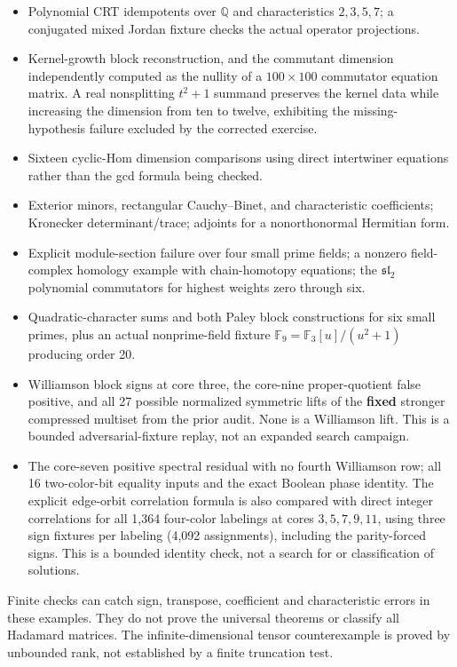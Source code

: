 \documentclass[
  11pt,
]{article}
\providecommand{\tightlist}{%
  \setlength{\itemsep}{0pt}\setlength{\parskip}{0pt}}
\begin{document}
\begin{itemize}
\tightlist
\item
  Polynomial CRT idempotents over \(\mathbb Q\) and characteristics
  \(2,3,5,7\); a conjugated mixed Jordan fixture checks the actual
  operator projections.
\item
  Kernel-growth block reconstruction, and the commutant dimension
  independently computed as the nullity of a \(100\times100\) commutator
  equation matrix. A real nonsplitting \(t^2+1\) summand preserves the
  kernel data while increasing the dimension from ten to twelve,
  exhibiting the missing-hypothesis failure excluded by the corrected
  exercise.
\item
  Sixteen cyclic-Hom dimension comparisons using direct intertwiner
  equations rather than the gcd formula being checked.
\item
  Exterior minors, rectangular Cauchy--Binet, and characteristic
  coefficients; Kronecker determinant/trace; adjoints for a
  nonorthonormal Hermitian form.
\item
  Explicit module-section failure over four small prime fields; a
  nonzero field-complex homology example with chain-homotopy equations;
  the \(\mathfrak{sl}_2\) polynomial commutators for highest weights
  zero through six.
\item
  Quadratic-character sums and both Paley block constructions for six
  small primes, plus an actual nonprime-field fixture
  \(\mathbb F_9=\mathbb F_3[u]/(u^2+1)\) producing order 20.
\item
  Williamson block signs at core three, the core-nine proper-quotient
  false positive, and all 27 possible normalized symmetric lifts of the
  \textbf{fixed} stronger compressed multiset from the prior audit. None
  is a Williamson lift. This is a bounded adversarial-fixture replay,
  not an expanded search campaign.
\item
  The core-seven positive spectral residual with no fourth Williamson
  row; all 16 two-color-bit equality inputs and the exact Boolean phase
  identity. The explicit edge-orbit correlation formula is also compared
  with direct integer correlations for all 1,364 four-color labelings at
  cores \(3,5,7,9,11\), using three sign fixtures per labeling (4,092
  assignments), including the parity-forced signs. This is a bounded
  identity check, not a search for or classification of solutions.
\end{itemize}

Finite checks can catch sign, transpose, coefficient and characteristic
errors in these examples. They do not prove the universal theorems or
classify all Hadamard matrices. The infinite-dimensional tensor
counterexample is proved by unbounded rank, not established by a finite
truncation test.
\end{document}
